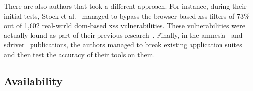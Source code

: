 \documentclass[10pt,journal,compsoc]{IEEEtran}
\begin{document}
There are also authors that took a different approach.
For instance, during their initial tests,
Stock et al.~\cite{SLMS14} managed to bypass
the browser-based {\sc xss} filters of
73\% out of 1,602 real-world {\sc dom}-based {\sc xss} vulnerabilities.
These vulnerabilities were actually found as part of
their previous research~\cite{LSJ13}.
Finally, in the {\sc amnesia}~\cite{HO05b} and
{\sc sd}river~\cite{MS09} publications,
the authors managed to break existing application suites
and then test the accuracy of their tools on them.

\vspace{-0.5mm}
\subsection{Availability}
\vspace{-0.8mm}
\end{document}
